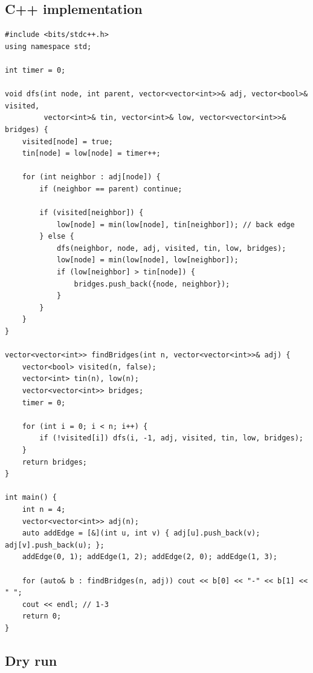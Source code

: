 \subsection*{C++ implementation}

\begin{lstlisting}
#include <bits/stdc++.h>
using namespace std;

int timer = 0;

void dfs(int node, int parent, vector<vector<int>>& adj, vector<bool>& visited,
         vector<int>& tin, vector<int>& low, vector<vector<int>>& bridges) {
    visited[node] = true;
    tin[node] = low[node] = timer++;

    for (int neighbor : adj[node]) {
        if (neighbor == parent) continue;

        if (visited[neighbor]) {
            low[node] = min(low[node], tin[neighbor]); // back edge
        } else {
            dfs(neighbor, node, adj, visited, tin, low, bridges);
            low[node] = min(low[node], low[neighbor]);
            if (low[neighbor] > tin[node]) {
                bridges.push_back({node, neighbor});
            }
        }
    }
}

vector<vector<int>> findBridges(int n, vector<vector<int>>& adj) {
    vector<bool> visited(n, false);
    vector<int> tin(n), low(n);
    vector<vector<int>> bridges;
    timer = 0;

    for (int i = 0; i < n; i++) {
        if (!visited[i]) dfs(i, -1, adj, visited, tin, low, bridges);
    }
    return bridges;
}

int main() {
    int n = 4;
    vector<vector<int>> adj(n);
    auto addEdge = [&](int u, int v) { adj[u].push_back(v); adj[v].push_back(u); };
    addEdge(0, 1); addEdge(1, 2); addEdge(2, 0); addEdge(1, 3);

    for (auto& b : findBridges(n, adj)) cout << b[0] << "-" << b[1] << " ";
    cout << endl; // 1-3
    return 0;
}
\end{lstlisting}

\subsection*{Dry run}


